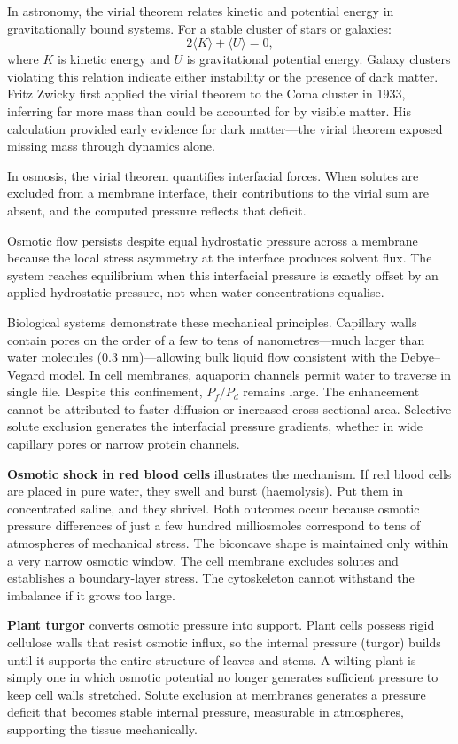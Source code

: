 In astronomy, the virial theorem relates kinetic and potential energy in gravitationally bound systems. For a stable cluster of stars or galaxies:
\[
2\langle K \rangle + \langle U \rangle = 0,
\]
where $K$ is kinetic energy and $U$ is gravitational potential energy. Galaxy clusters violating this relation indicate either instability or the presence of dark matter. Fritz Zwicky first applied the virial theorem to the Coma cluster in 1933, inferring far more mass than could be accounted for by visible matter. His calculation provided early evidence for dark matter—the virial theorem exposed missing mass through dynamics alone.

In osmosis, the virial theorem quantifies interfacial forces. When solutes are excluded from a membrane interface, their contributions to the virial sum are absent, and the computed pressure reflects that deficit.

Osmotic flow persists despite equal hydrostatic pressure across a membrane because the local stress asymmetry at the interface produces solvent flux. The system reaches equilibrium when this interfacial pressure is exactly offset by an applied hydrostatic pressure, not when water concentrations equalise.

Biological systems demonstrate these mechanical principles. Capillary walls contain pores on the order of a few to tens of nanometres—much larger than water molecules (0.3 nm)—allowing bulk liquid flow consistent with the Debye–Vegard model. In cell membranes, aquaporin channels permit water to traverse in single file. Despite this confinement, $P_f / P_d$ remains large. The enhancement cannot be attributed to faster diffusion or increased cross-sectional area. Selective solute exclusion generates the interfacial pressure gradients, whether in wide capillary pores or narrow protein channels.

\textbf{Osmotic shock in red blood cells} illustrates the mechanism. If red blood cells are placed in pure water, they swell and burst (haemolysis). Put them in concentrated saline, and they shrivel. Both outcomes occur because osmotic pressure differences of just a few hundred milliosmoles correspond to tens of atmospheres of mechanical stress. The biconcave shape is maintained only within a very narrow osmotic window. The cell membrane excludes solutes and establishes a boundary-layer stress. The cytoskeleton cannot withstand the imbalance if it grows too large.

\textbf{Plant turgor} converts osmotic pressure into support. Plant cells possess rigid cellulose walls that resist osmotic influx, so the internal pressure (turgor) builds until it supports the entire structure of leaves and stems. A wilting plant is simply one in which osmotic potential no longer generates sufficient pressure to keep cell walls stretched. Solute exclusion at membranes generates a pressure deficit that becomes stable internal pressure, measurable in atmospheres, supporting the tissue mechanically.

